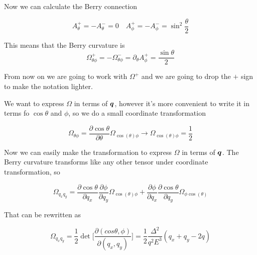 Now we can calculate the Berry connection

\begin{equation}
    A_\theta^+=-A_\theta^-=0 \quad A_\phi^+=-A_\phi^-=\sin^2\frac \theta 2
\end{equation}

This means that the Berry curvature is
\begin{equation}
    \Omega^+_{\theta\phi}=-\Omega^-_{\theta\phi}=\partial_\theta A^+_\phi=\frac{\sin \theta}2
\end{equation}

From now on we are going to work with $\Omega^+$ and we are going to drop the $+$ sign to make the notation lighter.

We want to express $\Omega$ in terms of $\boldsymbol{q}$, however it's more convenient to write it in terms fo  $\cos \theta$ and $\phi$, so we do a small coordinate transformation


\begin{equation}
    \Omega_{\theta\phi}=\frac{\partial\cos\theta}{\partial \theta}\Omega_{\cos(\theta)\phi} \rightarrow \Omega_{\cos(\theta)\phi}=\frac 12
\end{equation}



Now we can easily make the transformation to express $\Omega$ in terms of $\boldsymbol{q}$. The Berry curvature transforms like any other tensor under coordinate transformation, so

\begin{equation}
    \Omega_{q_xq_y}=\frac{\partial\cos \theta}{\partial q_x}\frac{\partial \phi}{\partial q_y}\Omega_{\cos(\theta)\phi}+\frac{\partial \phi}{\partial q_x}\frac{\partial\cos \theta}{\partial q_y}\Omega_{\phi\cos(\theta)} 
\end{equation}

That can be rewritten as

\begin{equation}
    \Omega_{q_xq_y}=\frac 12 \det\bigg[\frac{\partial (cos\theta,\phi)}{\partial (q_x,q_y)}\bigg]=\frac 12 \frac{\Delta^2}{q^2E^3}(q_x+q_y-2q)
\end{equation}


